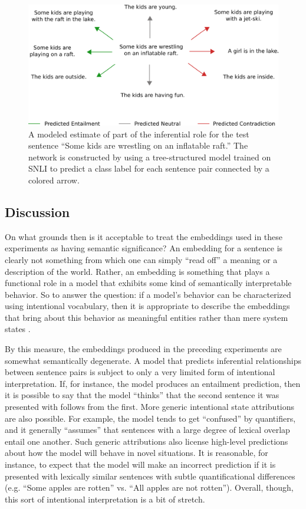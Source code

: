 \begin{figure}
\centering
	\includegraphics[scale=0.53]{figures/inf-role.png}
	\caption{A modeled estimate of part of the inferential role for the test sentence ``Some kids are wrestling on an inflatable raft.'' The network is constructed by using a tree-structured model trained on SNLI to predict a class label for each sentence pair connected by a colored arrow.}\label{fig:infrole}
\end{figure}

\subsection{Discussion}

On what grounds then is it acceptable to treat the embeddings used in these experiments as having semantic significance? An embedding for a sentence is clearly not something from which one can simply ``read off'' a meaning or a description of the world. Rather, an embedding is something that plays a functional role in a model that exhibits some kind of semantically interpretable behavior. So to answer the question: if a model's behavior can be characterized using intentional vocabulary, then it is appropriate to describe the embeddings that bring about this behavior as meaningful entities rather than mere system states \citep[see][]{Dennett:1987}. 

By this measure, the embeddings produced in the preceding experiments are somewhat semantically degenerate. A model that predicts inferential relationships between sentence pairs is subject to only a very limited form of intentional interpretation. If, for instance, the model produces an entailment prediction, then it is possible to say that the model ``thinks'' that the second sentence it was presented with follows from the first. More generic intentional state attributions are also possible. For example, the model tends to get ``confused'' by quantifiers, and it generally ``assumes'' that sentences with a large degree of lexical overlap entail one another. Such generic attributions also license high-level predictions about how the model will behave in novel situations. It is reasonable, for instance, to expect that the model will make an incorrect prediction if it is presented with lexically similar sentences with subtle quantificational differences (e.g. ``Some apples are rotten'' vs. ``All apples are not rotten''). Overall, though, this sort of intentional interpretation is a bit of stretch.

